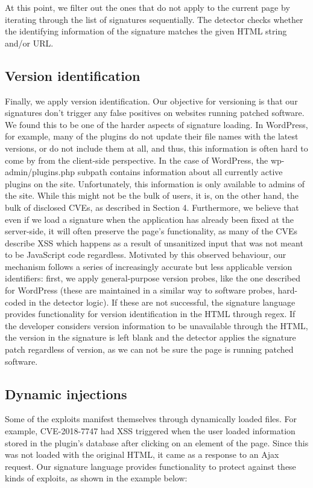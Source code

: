 At this point, we filter out the ones that do not apply to the current page by iterating through the list of signatures sequentially. The detector checks whether the identifying information of the signature matches the given HTML string and/or URL.

\subsection{Version identification}
Finally, we apply version identification. Our objective for versioning is that our signatures don't trigger any false positives on websites running patched software. We found this to be one of the harder aspects of signature loading. In WordPress, for example, many of the plugins do not update their file names with the latest versions, or do not include them at all, and thus, this information is often hard to come by from the client-side perspective. In the case of WordPress, the wp-admin/plugins.php subpath contains information about all currently active plugins on the site. Unfortunately, this information is only available to admins of the site. While this might not be the bulk of users, it is, on the other hand, the bulk of disclosed CVEs, as described in Section 4. Furthermore, we believe that even if we load a signature when the application has already been fixed at the server-side, it will often preserve the page's functionality, as many of the CVEs describe XSS which happens as a result of unsanitized input that was not meant to be JavaScript code regardless. Motivated by this observed behaviour, our mechanism follows a series of increasingly accurate but less applicable version identifiers: first, we apply general-purpose version probes, like the one described for WordPress (these are maintained in a similar way to software probes, hard-coded in the detector logic). If these are not successful, the signature language provides functionality for version identification in the HTML through regex. If the developer considers version information to be unavailable through the HTML, the version in the signature is left blank and the detector applies the signature patch regardless of version, as we can not be sure the page is running patched software.

\subsection{Dynamic injections}
Some of the exploits manifest themselves through dynamically loaded files. For example, CVE-2018-7747 had XSS triggered when the user loaded information stored in the plugin's database after clicking on an element of the page. Since this was not loaded with the original HTML, it came as a response to an Ajax request. Our signature language provides functionality to protect against these kinds of exploits, as shown in the example below:

